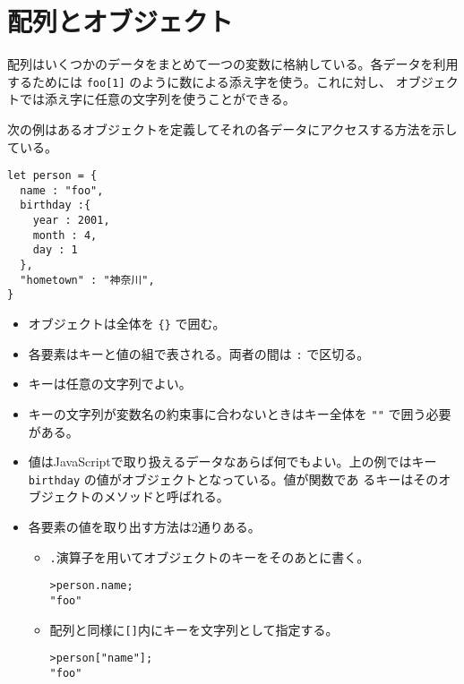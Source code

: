 \section{配列とオブジェクト}
配列はいくつかのデータをまとめて一つの変数に格納している。各データを利用
するためには \verb+foo[1]+ のように数による添え字を使う。これに対し、
オブジェクトでは添え字に任意の文字列を使うことができる。
\begin{Exec}\label{Execconstructor}\upshape
次の例はあるオブジェクトを定義してそれの各データにアクセスする方法を示している。
\begin{Verbatim}
let person = {
  name : "foo",
  birthday :{
    year : 2001,
    month : 4,
    day : 1
  },
  "hometown" : "神奈川",
}
\end{Verbatim}
\begin{itemize}
 \item オブジェクトは全体を \verb+{}+ で囲む。
 \item 各要素はキーと値の組で表される。両者の間は \verb+:+ で区切る。
 \item キーは任意の文字列でよい。
 \item キーの文字列が変数名の約束事に合わないときはキー全体を \verb+""+
			 で囲う必要がある。
 \item 値はJavaScriptで取り扱えるデータなあらば何でもよい。上の例ではキー
       \verb+birthday+ の値がオブジェクトとなっている。値が関数であ
       るキーはそのオブジェクトのメソッドと呼ばれる。
 \item 各要素の値を取り出す方法は2通りある。
\begin{itemize}
 \item \verb+.+演算子を用いてオブジェクトのキーをそのあとに書く。
\begin{Verbatim}
>person.name;
"foo"
\end{Verbatim}
 \item 配列と同様に\verb+[]+内にキーを文字列として指定する。
\begin{Verbatim}
>person["name"];
"foo"
\end{Verbatim}
\end{itemize}


\end{itemize}
\end{Exec}
